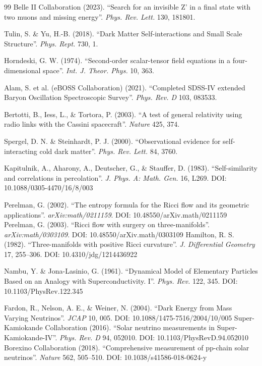 \documentclass[a4paper,12pt]{article}
\begin{document}
\begin{thebibliography}{99}
 Belle II Collaboration (2023). ``Search for an invisible Z' in a final state with two muons and missing energy''. \textit{Phys. Rev. Lett.} 130, 181801.

 Tulin, S. \& Yu, H.-B. (2018). ``Dark Matter Self-interactions and Small Scale Structure''. \textit{Phys. Rept.} 730, 1.

 Horndeski, G. W. (1974). ``Second-order scalar-tensor field equations in a four-dimensional space''. \textit{Int. J. Theor. Phys.} 10, 363.

 Alam, S. et al. (eBOSS Collaboration) (2021). ``Completed SDSS-IV extended Baryon Oscillation Spectroscopic Survey''. \textit{Phys. Rev. D} 103, 083533.


 Bertotti, B., Iess, L., \& Tortora, P. (2003). ``A test of general relativity using radio links with the Cassini spacecraft''. \textit{Nature} 425, 374.

 Spergel, D. N. \& Steinhardt, P. J. (2000). ``Observational evidence for self-interacting cold dark matter''. \textit{Phys. Rev. Lett.} 84, 3760.

 Kapitulnik, A., Aharony, A., Deutscher, G., \& Stauffer, D. (1983). ``Self-similarity and correlations in percolation''. \textit{J. Phys. A: Math. Gen.} 16, L269. DOI: 10.1088/0305-4470/16/8/003


 Perelman, G. (2002). ``The entropy formula for the Ricci flow and its geometric applications''. \textit{arXiv:math/0211159}. DOI: 10.48550/arXiv.math/0211159
 Perelman, G. (2003). ``Ricci flow with surgery on three-manifolds''. \textit{arXiv:math/0303109}. DOI: 10.48550/arXiv.math/0303109
 Hamilton, R. S. (1982). ``Three-manifolds with positive Ricci curvature''. \textit{J. Differential Geometry} 17, 255--306. DOI: 10.4310/jdg/1214436922

 Nambu, Y. \& Jona-Lasinio, G. (1961). ``Dynamical Model of Elementary Particles Based on an Analogy with Superconductivity. I''. \textit{Phys. Rev.} 122, 345. DOI: 10.1103/PhysRev.122.345

 Fardon, R., Nelson, A. E., \& Weiner, N. (2004). ``Dark Energy from Mass Varying Neutrinos''. \textit{JCAP} 10, 005. DOI: 10.1088/1475-7516/2004/10/005
 Super-Kamiokande Collaboration (2016). ``Solar neutrino measurements in Super-Kamiokande-IV''. \textit{Phys. Rev. D} 94, 052010. DOI: 10.1103/PhysRevD.94.052010
 Borexino Collaboration (2018). ``Comprehensive measurement of pp-chain solar neutrinos''. \textit{Nature} 562, 505--510. DOI: 10.1038/s41586-018-0624-y


\end{thebibliography}
\end{document}

